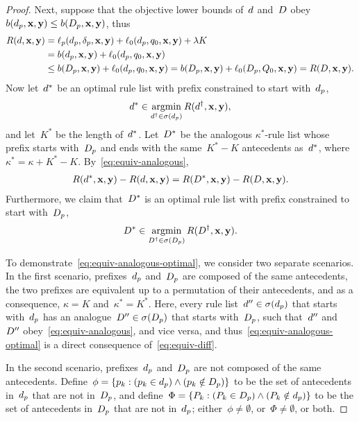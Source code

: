\begin{arxiv}
\begin{proof}
Next, suppose that the objective lower bounds of~${d}$ and~${D}$
obey ${b(d_p, \mathbf{x}, \mathbf{y}) \le b(D_p, \mathbf{x}, \mathbf{y})}$, thus
\begin{align}
R({d}, \mathbf{x}, \mathbf{y})
&= \ell_p(d_p, \delta_p, \mathbf{x}, \mathbf{y}) + \ell_0(d_p, q_0, \mathbf{x}, \mathbf{y}) + {\lambda} K \nonumber \\
&= b(d_p, \mathbf{x}, \mathbf{y}) + \ell_0(d_p, q_0, \mathbf{x}, \mathbf{y}) \nonumber \\
&\le b(D_p, \mathbf{x}, \mathbf{y}) + \ell_0(d_p, q_0, \mathbf{x}, \mathbf{y})
= b(D_p, \mathbf{x}, \mathbf{y}) + \ell_0(D_p, Q_0, \mathbf{x}, \mathbf{y})
= R({D}, \mathbf{x}, \mathbf{y}).
\label{eqref:equiv-ineq}
\end{align}
Now let~${d}^*$ be an optimal rule list with prefix
constrained to start with~$d_p$,
\begin{align}
{d}^* \in \operatorname*{argmin}_{{d}^\dagger \in \sigma(d_p)} R({d}^\dagger, \mathbf{x}, \mathbf{y}),
\end{align}
and let~$K^*$ be the length of~${d}^*$.
%
Let~${D}^*$ be the analogous $\kappa^*$-rule list whose prefix starts
with~$D_p$ and ends with the same~${K^* - K}$ antecedents as~${d}^*$,
where~${\kappa^* = \kappa + K^* - K}$.
%
By~\eqref{eq:equiv-analogous},
\begin{align}
R({d}^*, \mathbf{x}, \mathbf{y}) - R({d}, \mathbf{x}, \mathbf{y})
= R({D}^*, \mathbf{x}, \mathbf{y}) - R({D}, \mathbf{x}, \mathbf{y}).
\label{eq:equiv-diff}
\end{align}
Furthermore, we claim that~${D}^*$ is an optimal rule list
with prefix constrained to start with~$D_p$,
\begin{align}
{D}^* \in \operatorname*{argmin}_{{D}^\dagger \in \sigma(D_p)} R({D}^\dagger, \mathbf{x}, \mathbf{y}).
\label{eq:equiv-analogous-optimal}
\end{align}

To demonstrate~\eqref{eq:equiv-analogous-optimal},
we consider two separate scenarios.
%
In the first scenario, prefixes~$d_p$ and~$D_p$
are composed of the same antecedents,
\ie the two prefixes are equivalent up to a permutation of
their antecedents, and as a consequence,
${\kappa = K}$ and~${\kappa^* = K^*}$.
%
Here, every rule list~${{d}'' \in \sigma(d_p)}$
that starts with~$d_p$
has an analogue~${{D}'' \in \sigma(D_p)}$
that starts with~$D_p$,
such that~${d}''$ and~${D}''$ obey~\eqref{eq:equiv-analogous},
and vice versa, and thus~\eqref{eq:equiv-analogous-optimal}
is a direct consequence of~\eqref{eq:equiv-diff}.

In the second scenario, prefixes~$d_p$ and~$D_p$
are not composed of the same antecedents.
%
Define~${\phi = \{p_k : (p_k \in d_p) \wedge (p_k \notin D_p)\}}$
to be the set of antecedents in~$d_p$ that are not in~$D_p$,
and define~${\Phi = \{P_k : (P_k \in D_p) \wedge (P_k \notin d_p)\}}$
to be the set of antecedents in~$D_p$ that are not in~$d_p$;
either~${\phi \neq \emptyset}$, or~${\Phi \neq \emptyset}$, or both.


\end{proof}
\end{arxiv}
